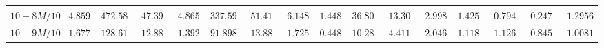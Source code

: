 \begin{landscape}
\begin{tabular}{|c|c|c|c|c|c|c|c|c|c|c|c|c|c|c|c}
$10 + 8M/10$ & $4.8590$                                                        & $472.5872$                                                      & $47.3930$                                                         & $4.8659$                                                           & $337.5925$                                                            & $51.4150$                                                       & $6.1487$                                                          & $1.4483$                                                           & $36.8062$                                                             & $13.3006$                                                       & $2.9984$                                                          & $1.4253$                                                        & $0.79462$                                                          & $0.24765$                                                           & \multicolumn{1}{c|}{$1.29567$}                                                              \\ \hline
$10 + 9M/10$ & $1.6771$                                                        & $128.6127$                                                      & $12.8898$                                                         & $1.3923$                                                           & $91.8983$                                                             & $13.8856$                                                       & $1.7250$                                                          & $0.4481$                                                           & $10.2870$                                                             & $4.4118$                                                        & $2.0468$                                                          & $1.11841$                                                        & $1.1269$                                                          & $0.84543$                                                           & $1.00813$                                                                                   \\ \hline 
\end{tabular}
\end{landscape}
